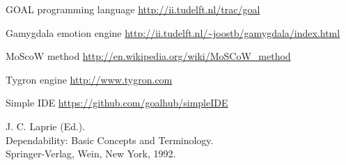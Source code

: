 \documentclass[11pt]{article}
\begin{document}
\begin{thebibliography}{9}
	
	GOAL programming language
	\url{http://ii.tudelft.nl/trac/goal}
	
	Gamygdala emotion engine
	\url{http://ii.tudelft.nl/~joostb/gamygdala/index.html}
	
	MoScoW method
	\url{http://en.wikipedia.org/wiki/MoSCoW_method }
	
	Tygron engine
	\url{http://www.tygron.com }
	
	Simple IDE
	\url{https://github.com/goalhub/simpleIDE }
	
	J. C. Laprie (Ed.).\\ 
	Dependability: Basic Concepts and Terminology. \\
	Springer-Verlag, Wein, New York, 1992.\\
	
	
\end{thebibliography}
\end{document}
